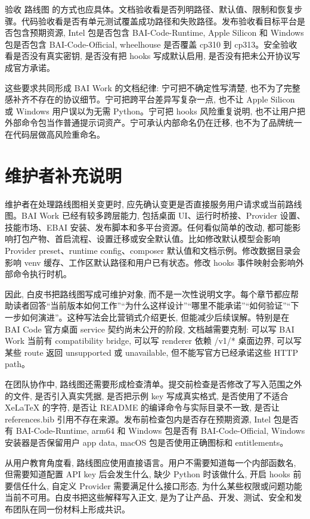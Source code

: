 验收 路线图 的方式也应具体。文档验收看是否列明路径、默认值、限制和恢复步骤。代码验收看是否有单元测试覆盖成功路径和失败路径。发布验收看目标平台是否包含预期资源, Intel 包是否包含 BAI-Code-Runtime, Apple Silicon 和 Windows 包是否包含 BAI-Code-Official, wheelhouse 是否覆盖 cp310 到 cp313。安全验收看是否没有真实密钥, 是否没有把 hooks 写成默认启用, 是否没有把未公开协议写成官方承诺。

这些要求共同形成 BAI Work 的文档纪律: 宁可把不确定性写清楚, 也不为了完整感补齐不存在的协议细节。宁可把跨平台差异写复杂一点, 也不让 Apple Silicon 或 Windows 用户误以为无需 Python。宁可把 hooks 风险重复说明, 也不让用户把外部命令包当作普通提示词资产。宁可承认内部命名仍在迁移, 也不为了品牌统一在代码层做高风险重命名。

\section{维护者补充说明}

维护者在处理路线图相关变更时, 应先确认变更是否直接服务用户请求或当前路线图。BAI Work 已经有较多跨层能力, 包括桌面 UI、运行时桥接、Provider 设置、技能市场、EBAI 安装、发布脚本和多平台资源。任何看似简单的改动, 都可能影响打包产物、首启流程、设置迁移或安全默认值。比如修改默认模型会影响 Provider preset、runtime config、composer 默认值和文档示例。修改数据目录会影响 venv 缓存、工作区默认路径和用户已有状态。修改 hooks 事件映射会影响外部命令执行时机。

因此, 白皮书把路线图写成可维护对象, 而不是一次性说明文字。每个章节都应帮助读者回答“当前版本如何工作”“为什么这样设计”“哪里不能承诺”“如何验证”“下一步如何演进”。这种写法会比营销式介绍更长, 但能减少后续误解。特别是在 BAI Code 官方桌面 service 契约尚未公开的阶段, 文档越需要克制: 可以写 BAI Work 当前有 compatibility bridge, 可以写 renderer 依赖 /v1/* 桌面边界, 可以写某些 route 返回 unsupported 或 unavailable, 但不能写官方已经承诺这些 HTTP path。

在团队协作中, 路线图还需要形成检查清单。提交前检查是否修改了写入范围之外的文件, 是否引入真实凭据, 是否把示例 key 写成真实格式, 是否使用了不适合 XeLaTeX 的字符, 是否让 README 的编译命令与实际目录不一致, 是否让 references.bib 引用不存在来源。发布前检查包内是否存在预期资源, Intel 包是否有 BAI-Code-Runtime, arm64 和 Windows 包是否有 BAI-Code-Official, Windows 安装器是否保留用户 app data, macOS 包是否使用正确图标和 entitlements。

从用户教育角度看, 路线图应使用直接语言。用户不需要知道每一个内部函数名, 但需要知道配置 API key 后会发生什么, 缺少 Python 时该做什么, 开启 hooks 前要信任什么, 自定义 Provider 需要满足什么接口形态, 为什么某些权限或问题功能当前不可用。白皮书把这些解释写入正文, 是为了让产品、开发、测试、安全和发布团队在同一份材料上形成共识。

